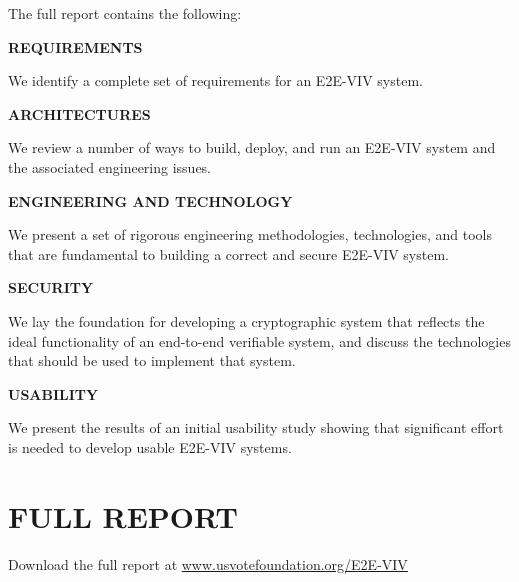 The full report contains the following:

\noindent \textbf{REQUIREMENTS}

We identify a complete set of requirements for an E2E-VIV system.

\noindent \textbf{ARCHITECTURES}

We review a number of ways to build, deploy, and run an E2E-VIV system
and the associated engineering issues.

\noindent \textbf{ENGINEERING AND TECHNOLOGY}

We present a set of rigorous engineering methodologies, technologies,
and tools that are fundamental to building a correct and secure
E2E-VIV system.

\noindent \textbf{SECURITY}

We lay the foundation for developing a cryptographic system that
reflects the ideal functionality of an end-to-end verifiable system,
and discuss the technologies that should be used to implement that
system.

\noindent \textbf{USABILITY}

We present the results of an initial usability study showing that
significant effort is needed to develop usable E2E-VIV systems.

\vspace{1cm}

\section*{FULL REPORT}

Download the full report at \url{www.usvotefoundation.org/E2E-VIV}
